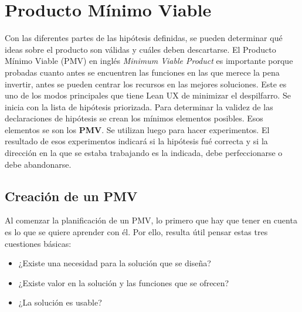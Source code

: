     



\clearpage
\section{Producto Mínimo Viable}
Con las diferentes partes de las hipótesis definidas, se pueden determinar qué ideas sobre el producto son válidas y cuáles deben descartarse. El Producto Mínimo Viable (PMV) en inglés \textit{Minimum Viable Product} es importante porque probadas cuanto antes se encuentren las funciones en las que merece la pena invertir, antes se pueden centrar los recursos en las mejores soluciones. Este es uno de los modos principales que tiene Lean UX de minimizar el despilfarro. Se inicia con la lista de hipótesis priorizada. Para determinar la validez de las declaraciones de hipótesis se crean los mínimos elementos posibles. Esos elementos se son los \textbf{PMV}. Se utilizan luego para hacer experimentos. El resultado de esos experimentos indicará si la hipótesis fué correcta y si la dirección en la que se estaba trabajando es la indicada, debe perfeccionarse o debe abandonarse.

\subsection{Creación de un PMV}
Al comenzar la planificación de un PMV, lo primero que hay que tener en cuenta es lo que se quiere aprender con él. Por ello, resulta útil pensar estas tres cuestiones básicas: 
\begin{itemize}
    \item ¿Existe una necesidad para la solución que se diseña? 
    \item ¿Existe valor en la solución y las funciones que se ofrecen?
    \item  ¿La solución es usable?
\end{itemize}

